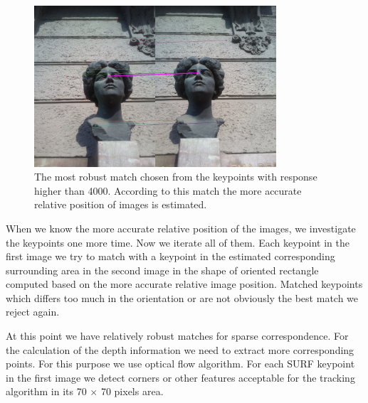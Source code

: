 \begin{figure}[h]
\centerline{
\includegraphics[width=9cm]{img/ema_direction.png}}
\caption{The most robust match chosen from the keypoints with response higher than 4000. According to this match the more accurate relative position of images is estimated.}
\label{fig:overlap}
\end{figure}

When we know the more accurate relative position of the images, we investigate the keypoints one more time.
Now we iterate all of them. 
Each keypoint in the first image we try to match with a keypoint in the estimated corresponding surrounding area in the second image in the shape of oriented rectangle computed based on the more accurate relative image position.
Matched keypoints which differs too much in the orientation or are not obviously the best match we reject again.

At this point we have relatively robust matches for sparse correspondence. 
For the calculation of the depth information we need to extract more corresponding points.
For this purpose we use optical flow algorithm. 
For each SURF keypoint in the first image we detect corners or other features acceptable for the tracking algorithm in its 70 $\times$ 70 pixels area.

